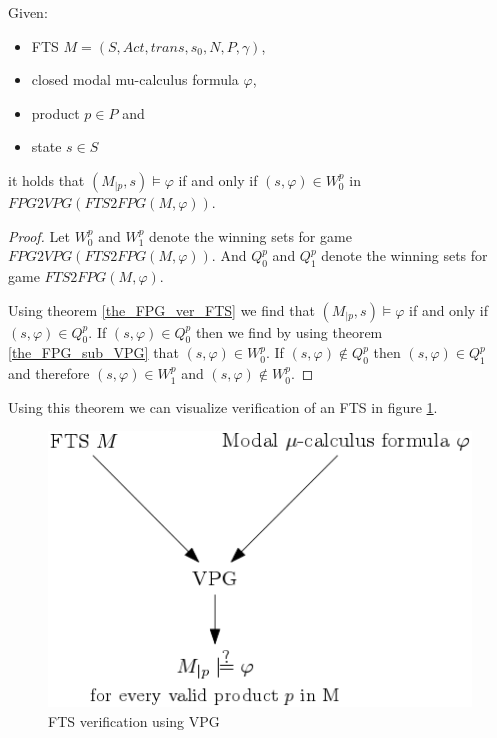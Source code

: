 \begin{theorem}
	\label{the_VPG_ver_FTS}
	Given:
	\begin{itemize}
		\item FTS $M = (S, Act, trans, s_0, N, P, \gamma)$,
		\item closed modal mu-calculus formula $\varphi$,
		\item product $p \in P$ and
		\item state $s \in S$
	\end{itemize}
	it holds that $(M_{|p}, s) \models \varphi$ if and only if $(s, \varphi) \in W_0^{p}$ in $\textit{FPG2VPG}(\textit{FTS2FPG}(M, \varphi))$.
	\begin{proof}
		Let $W_0^{p}$ and $W_1^{p}$ denote the winning sets for game $\textit{FPG2VPG}(\textit{FTS2FPG}(M, \varphi))$. And $Q_0^{p}$ and $Q_1^{p}$ denote the winning sets for game $\textit{FTS2FPG}(M, \varphi)$.
		
		Using theorem \ref{the_FPG_ver_FTS} we find that $(M_{|p}, s) \models \varphi$ if and only if $(s, \varphi) \in Q_0^{p}$. If $(s, \varphi) \in Q_0^{p}$ then we find by using theorem \ref{the_FPG_sub_VPG} that $(s, \varphi) \in W_0^{p}$. If $(s, \varphi) \not\in Q_0^{p}$ then $(s, \varphi) \in Q_1^{p}$ and therefore $(s, \varphi) \in W_1^{p}$ and $(s, \varphi) \not\in W_0^{p}$.
	\end{proof}
\end{theorem}
Using this theorem we can visualize verification of an FTS in figure \ref{fig:ftsverificationusingvpg}.
\begin{figure}[h]
	\centering
	\includegraphics[scale=0.5]{Diagrams/FTSVerificationUsingVPG}
	\caption[FTS verification using VPG]{FTS verification using VPG}
	\label{fig:ftsverificationusingvpg}
\end{figure}

